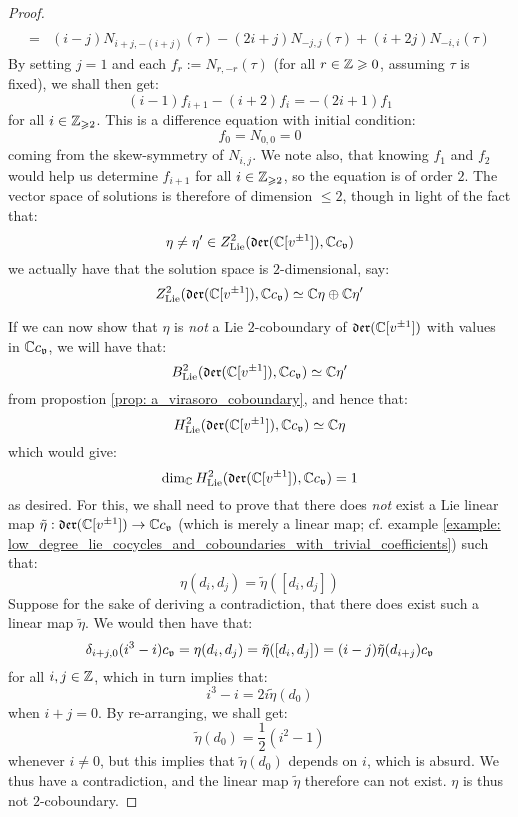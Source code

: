 \begin{proof}
$$\begin{aligned}
                            \\
                            = & (i - j)  N_{i + j, -(i + j)}(\tau) - (2i + j) N_{-j, j}(\tau) + (i + 2j) N_{-i, i}(\tau)
                        \end{aligned}
                    $$
                By setting $j = 1$ and each $f_r := N_{r, -r}(\tau)$ (for all $r \in \mathbb{Z} \geqslant 0$, assuming $\tau$ is fixed), we shall then get:
                    $$(i - 1) f_{i + 1} - (i + 2) f_i = -(2i + 1) f_1$$
                for all $i \in \mathbb{Z}_{\geqslant 2}$. This is a difference equation with initial condition:
                    $$f_0 = N_{0, 0} = 0$$
                coming from the skew-symmetry of $N_{i, j}$. We note also, that knowing $f_1$ and $f_2$ would help us determine $f_{i + 1}$ for all $i \in \mathbb{Z}_{\geqslant 2}$, so the equation is of order $2$. The vector space of solutions is therefore of dimension $\leq 2$, though in light of the fact that:
                    $$\eta \not = \eta' \in Z^2_{\mathrm{Lie}}(\mathfrak{der}(\mathbb{C}[v^{\pm 1}]), \mathbb{C} c_{\mathfrak{v}})$$
                we actually have that the solution space is $2$-dimensional, say:
                    $$Z^2_{\mathrm{Lie}}(\mathfrak{der}(\mathbb{C}[v^{\pm 1}]), \mathbb{C} c_{\mathfrak{v}}) \simeq \mathbb{C} \eta \oplus \mathbb{C} \eta'$$
    
                If we can now show that $\eta$ is \textit{not} a Lie $2$-coboundary of $\mathfrak{der}(\mathbb{C}[v^{\pm 1}])$ with values in $\mathbb{C} c_{\mathfrak{v}}$, we will have that:
                    $$B^2_{\mathrm{Lie}}(\mathfrak{der}(\mathbb{C}[v^{\pm 1}]), \mathbb{C} c_{\mathfrak{v}}) \simeq \mathbb{C} \eta'$$
                from propostion \ref{prop: a_virasoro_coboundary}, and hence that:
                    $$H^2_{\mathrm{Lie}}(\mathfrak{der}(\mathbb{C}[v^{\pm 1}]), \mathbb{C} c_{\mathfrak{v}}) \simeq \mathbb{C} \eta$$
                which would give:
                    $$\dim_{\mathbb{C}} H^2_{\mathrm{Lie}}(\mathfrak{der}(\mathbb{C}[v^{\pm 1}]), \mathbb{C} c_{\mathfrak{v}}) = 1$$
                as desired. For this, we shall need to prove that there does \textit{not} exist a Lie linear map $\tilde{\eta}: \mathfrak{der}(\mathbb{C}[v^{\pm 1}]) \to \mathbb{C} c_{\mathfrak{v}}$ (which is merely a linear map; cf. example \ref{example: low_degree_lie_cocycles_and_coboundaries_with_trivial_coefficients}) such that:
                    $$\eta(d_i, d_j) = \tilde{\eta}([d_i, d_j])$$
                Suppose for the sake of deriving a contradiction, that there does exist such a linear map $\tilde{\eta}$. We would then have that:
                    $$\delta_{i + j, 0} (i^3 - i) c_{\mathfrak{v}} = \eta(d_i, d_j) = \tilde{\eta}([d_i, d_j]) = (i - j) \tilde{\eta}(d_{i + j}) c_{\mathfrak{v}}$$
                for all $i, j \in \mathbb{Z}$, which in turn implies that:
                    $$i^3 - i = 2i \tilde{\eta}(d_0)$$
                when $i + j = 0$. By re-arranging, we shall get:
                    $$\tilde{\eta}(d_0) = \frac12(i^2 - 1)$$
                whenever $i \not = 0$, but this implies that $\tilde{\eta}(d_0)$ depends on $i$, which is absurd. We thus have a contradiction, and the linear map $\tilde{\eta}$ therefore can not exist. $\eta$ is thus not $2$-coboundary.
            \end{proof}